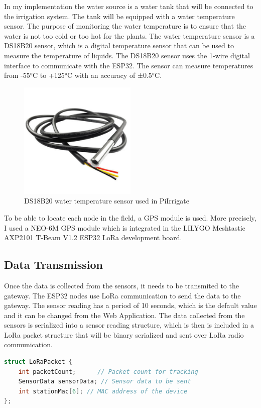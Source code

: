In my implementation the water source is a water tank that will be connected to the irrigation system.
The tank will be equipped with a water temperature sensor. The purpose
of monitoring the water temperature is to ensure that the water is not too cold or too hot for the plants.
The water temperature sensor is a DS18B20 sensor, which is a digital temperature sensor that can be used to measure the temperature of liquids.
The DS18B20 sensor uses the 1-wire digital interface to communicate with the ESP32.
The sensor can measure temperatures from -55°C to +125°C with an accuracy of ±0.5°C.

\begin{figure}[H]
    \centering
    \includegraphics[width=0.5\textwidth]{images/water-temp.png}
    \caption{DS18B20 water temperature sensor used in PiIrrigate}
    \label{fig:ds18b20}
\end{figure}

To be able to locate each node in the field, a GPS module is used. More precisely, I used a NEO-6M GPS module
which is integrated in the LILYGO Meshtastic AXP2101 T-Beam V1.2 ESP32 LoRa development board.

\subsection {Data Transmission}
Once the data is collected from the sensors, it needs to be transmited to the gateway.
The ESP32 nodes use LoRa communication to send the data to the gateway. 
The sensor reading has a period of 10 seconds, which is the default value and it can be changed from the Web Application.
The data collected from the sensors is serialized into a sensor reading structure, 
which is then is included in a LoRa packet structure that will be 
binary serialized and sent over LoRa radio communication.
\begin{lstlisting}[language=C, caption={LoRa packet structure}]
struct LoRaPacket {
    int packetCount;      // Packet count for tracking
    SensorData sensorData; // Sensor data to be sent
    int stationMac[6]; // MAC address of the device
};
\end{lstlisting}

